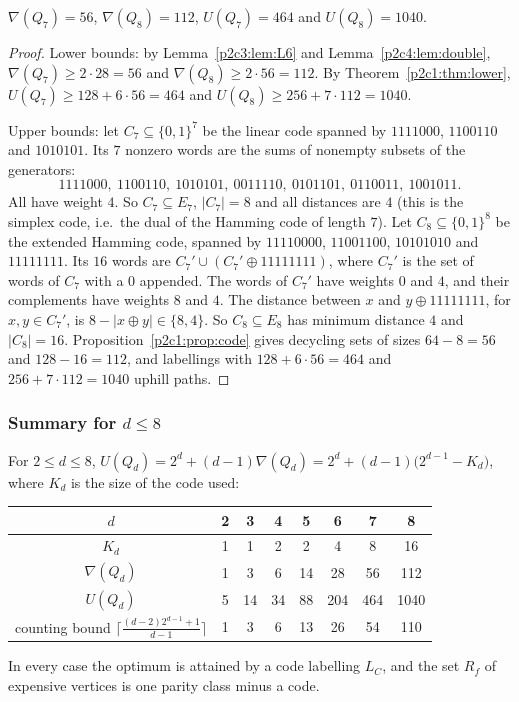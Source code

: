 \begin{theorem}\label{p2c4:thm:main}
$\nabla(Q_7)=56$, $\nabla(Q_8)=112$, $U(Q_7)=464$ and $U(Q_8)=1040$.
\end{theorem}

\begin{proof}
Lower bounds: by Lemma~\ref{p2c3:lem:L6} and Lemma~\ref{p2c4:lem:double},
$\nabla(Q_7)\ge2\cdot28=56$ and $\nabla(Q_8)\ge2\cdot56=112$. By Theorem~\ref{p2c1:thm:lower},
$U(Q_7)\ge128+6\cdot56=464$ and $U(Q_8)\ge256+7\cdot112=1040$.

Upper bounds: let $C_7\subseteq\{0,1\}^7$ be the linear code spanned by $1111000$, $1100110$ and
$1010101$. Its $7$ nonzero words are the sums of nonempty subsets of the generators:
\[
1111000,\ 1100110,\ 1010101,\ 0011110,\ 0101101,\ 0110011,\ 1001011.
\]
All have weight $4$. So $C_7\subseteq E_7$, $|C_7|=8$ and all distances are $4$ (this is the
simplex code, i.e.\ the dual of the Hamming code of length $7$). Let $C_8\subseteq\{0,1\}^8$ be the
extended Hamming code, spanned by $11110000$, $11001100$, $10101010$ and $11111111$. Its $16$ words
are $C_7'\cup(C_7'\oplus11111111)$, where $C_7'$ is the set of words of $C_7$ with a $0$ appended.
The words of $C_7'$ have weights $0$ and $4$, and their complements have weights $8$ and $4$. The
distance between $x$ and $y\oplus11111111$, for $x,y\in C_7'$, is $8-|x\oplus y|\in\{8,4\}$. So
$C_8\subseteq E_8$ has minimum distance $4$ and $|C_8|=16$. Proposition~\ref{p2c1:prop:code}
gives decycling sets of sizes $64-8=56$ and $128-16=112$, and labellings with
$128+6\cdot56=464$ and $256+7\cdot112=1040$ uphill paths.
\end{proof}

\subsubsection{Summary for $d\le8$}

\begin{corollary}\label{p2c4:cor:table}
For $2\le d\le8$, $U(Q_d)=2^d+(d-1)\nabla(Q_d)=2^d+(d-1)\bigl(2^{d-1}-K_d\bigr)$, where $K_d$ is
the size of the code used:
\begin{center}
\begin{tabular}{c|ccccccc}
\toprule
$d$ & 2 & 3 & 4 & 5 & 6 & 7 & 8\\
\midrule
$K_d$ & 1 & 1 & 2 & 2 & 4 & 8 & 16\\
$\nabla(Q_d)$ & 1 & 3 & 6 & 14 & 28 & 56 & 112\\
$U(Q_d)$ & 5 & 14 & 34 & 88 & 204 & 464 & 1040\\
counting bound $\lceil\frac{(d-2)2^{d-1}+1}{d-1}\rceil$ & 1 & 3 & 6 & 13 & 26 & 54 & 110\\
\bottomrule
\end{tabular}
\end{center}
In every case the optimum is attained by a code labelling $L_C$, and the set $R_f$ of expensive
vertices is one parity class minus a code.
\end{corollary}


